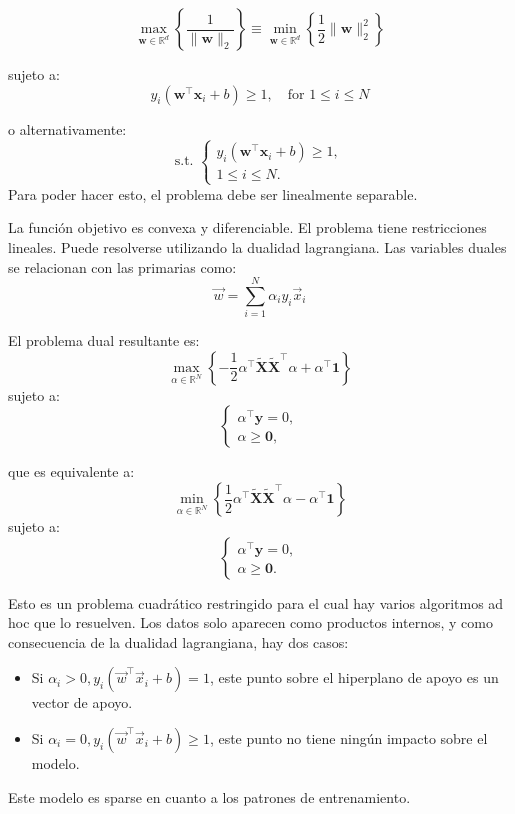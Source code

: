 $$
\max_{\mathbf{w} \in \mathbb{R}^d} \left\{ \frac{1}{\|\mathbf{w}\|_2} \right\} 
\equiv 
\min_{\mathbf{w} \in \mathbb{R}^d} \left\{ \frac{1}{2} \|\mathbf{w}\|_2^2 \right\}$$

sujeto a:
$$y_i(\mathbf{w}^\top \mathbf{x}_i + b) \geq 1, \quad \text{for } 1 \leq i \leq N$$

o alternativamente:
$$
\text{s.t. } 
\begin{cases}
y_i(\mathbf{w}^\top \mathbf{x}_i + b) \geq 1, \\
1 \leq i \leq N.
\end{cases}$$
Para poder hacer esto, el problema debe ser linealmente separable.

La función objetivo es convexa y diferenciable. El problema tiene restricciones lineales. Puede resolverse utilizando la dualidad lagrangiana. Las variables duales se relacionan con las primarias como:
$$\vec{w} = \sum^N_{i = 1} \alpha_iy_i\vec{x}_i$$

El problema dual resultante es:
$$\max_{\alpha \in \mathbb{R}^N} \left\{ -\frac{1}{2} \alpha^\top \tilde{\mathbf{X}}\tilde{\mathbf{X}}^\top \alpha + \alpha^\top \mathbf{1} \right\}$$
sujeto a:
$$\begin{cases} 
\alpha^\top \mathbf{y} = 0, \\ 
\alpha \geq \mathbf{0}, 
\end{cases}$$

que es equivalente a:
$$\min_{\alpha \in \mathbb{R}^N} \left\{ \frac{1}{2} \alpha^\top \tilde{\mathbf{X}}\tilde{\mathbf{X}}^\top \alpha - \alpha^\top \mathbf{1} \right\}$$
sujeto a:
$$\begin{cases} 
\alpha^\top \mathbf{y} = 0, \\ 
\alpha \geq \mathbf{0}. 
\end{cases}$$

Esto es un problema cuadrático restringido para el cual hay varios algoritmos ad hoc que lo resuelven. Los datos solo aparecen como productos internos, y como consecuencia de la dualidad lagrangiana, hay dos casos:
\begin{itemize}
\item Si $\alpha_i > 0, y_i(\vec{w}^\intercal \vec{x}_i + b) = 1$, este punto sobre el hiperplano de apoyo es un vector de apoyo.
\item Si $\alpha_i = 0, y_i(\vec{w}^\intercal \vec{x}_i + b) \geq 1$, este punto no tiene ningún impacto sobre el modelo.
\end{itemize}
Este modelo es sparse en cuanto a los patrones de entrenamiento.

